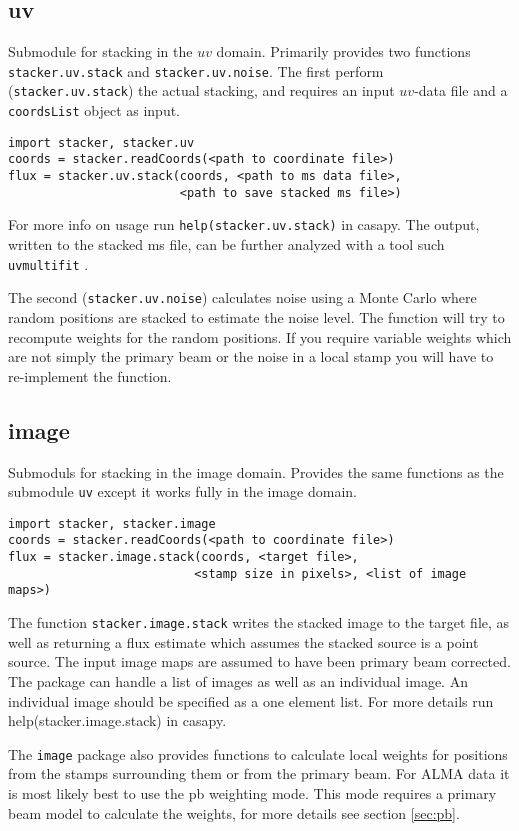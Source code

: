 \documentclass{article}
\begin{document}
\subsection{uv}
Submodule for stacking in the $uv$ domain. 
Primarily provides two functions {\tt stacker.uv.stack} and {\tt stacker.uv.noise}.
The first perform ({\tt stacker.uv.stack}) the actual stacking, 
and requires an input $uv$-data file and a {\tt coordsList} object as input.
\begin{verbatim}
import stacker, stacker.uv
coords = stacker.readCoords(<path to coordinate file>)
flux = stacker.uv.stack(coords, <path to ms data file>, 
                        <path to save stacked ms file>)
\end{verbatim}
For more info on usage run {\tt help(stacker.uv.stack)} in casapy.
The output, written to the stacked ms file,
can be further analyzed with a tool such {\tt uvmultifit} \citep{vidal2014}.

The second ({\tt stacker.uv.noise}) calculates noise using a Monte Carlo
where random positions are stacked to estimate the noise level. 
The function will try to recompute weights for the random positions.
If you require variable weights which are not simply the primary beam
or the noise in a local stamp you will have to re-implement the function.


\subsection{image}
Submoduls for stacking in the image domain.
Provides the same functions as the submodule {\tt uv} except it works fully in the image domain.
\begin{verbatim}
import stacker, stacker.image
coords = stacker.readCoords(<path to coordinate file>)
flux = stacker.image.stack(coords, <target file>, 
                          <stamp size in pixels>, <list of image maps>)
\end{verbatim}
The function {\tt stacker.image.stack} writes the stacked image to the target file,
as well as returning a flux estimate which assumes the stacked source is a point source.
The input image maps are assumed to have been primary beam corrected.
The package can handle a list of images as well as an individual image.
An individual image should be specified as a one element list.
For more details run help(stacker.image.stack) in casapy.

The {\tt image} package also provides functions to calculate local weights for
positions from the stamps surrounding them or from the primary beam.
For ALMA data it is most likely best to use the pb weighting mode.
This mode requires a primary beam model to calculate the weights, 
for more details see section \ref{sec:pb}.
\end{document}
